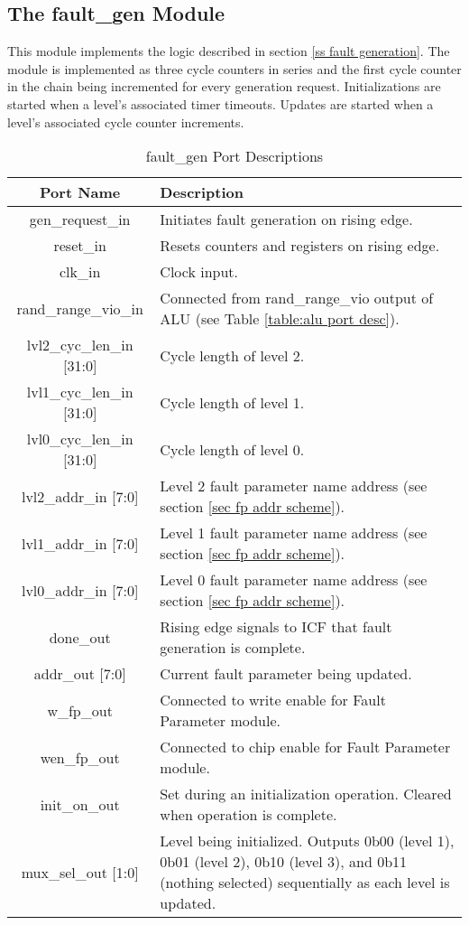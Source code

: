 \documentclass[]{report}
\begin{document}
\clearpage
\subsection{The fault\_gen Module}
\label{ss fault gen module}

This module implements the logic described in section \ref{ss fault generation}. The module is implemented as three cycle counters in series and the first cycle counter in the chain being incremented for every generation request. Initializations are started when a level's associated timer timeouts. Updates are started when a level's associated cycle counter increments. 

\begin{center}
	\begin{longtable}{|c|p{11cm}|}
		\caption{fault\_gen Port Descriptions}
		\label{table:fault gen port desc}\\
		\hline 
		Port Name & Description \\ 
		\hline 
		\endhead
		gen\_request\_in & Initiates fault generation on rising edge.\\
		\hline
		reset\_in & Resets counters and registers on rising edge.\\     
		\hline
		clk\_in & Clock input.\\
		\hline
		rand\_range\_vio\_in & Connected from rand\_range\_vio output of ALU (see Table \ref{table:alu port desc}).\\
		\hline
		lvl2\_cyc\_len\_in [31:0] & Cycle length of level 2.\\
		\hline
		lvl1\_cyc\_len\_in [31:0] & Cycle length of level 1.\\
		\hline
		lvl0\_cyc\_len\_in [31:0] & Cycle length of level 0.\\
		\hline
		lvl2\_addr\_in [7:0] & Level 2 fault parameter name address (see section \ref{sec fp addr scheme}).\\
		\hline
		lvl1\_addr\_in [7:0] & Level 1 fault parameter name address (see section \ref{sec fp addr scheme}).\\
		\hline
		lvl0\_addr\_in [7:0] & Level 0 fault parameter name address (see section \ref{sec fp addr scheme}).\\
		\hline
		done\_out & Rising edge signals to ICF that fault generation is complete.\\
		\hline
		addr\_out [7:0] & Current fault parameter being updated.\\
		\hline
		w\_fp\_out &  Connected to write enable for Fault Parameter module.\\
		\hline
		wen\_fp\_out & Connected to chip enable for Fault Parameter module.\\
		\hline
		init\_on\_out & Set during an initialization operation. Cleared when operation is complete.\\ 
		\hline
		mux\_sel\_out [1:0] & Level being initialized. Outputs 0b00 (level 1), 0b01 (level 2), 0b10 (level 3), and 0b11 (nothing selected) sequentially as each level is updated.\\
		\hline
	\end{longtable}
\end{center}
\end{document}

